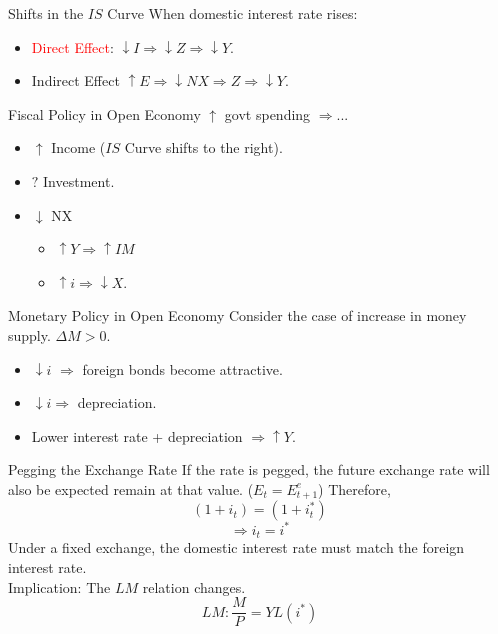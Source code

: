 \documentclass[shownotes,11pt, aspectratio=169]{beamer}
\begin{document}
\begin{frame}{Shifts in the $IS$ Curve}
When domestic interest rate rises:
\begin{itemize}
\item \textcolor{red}{Direct Effect}: $\downarrow I \Rightarrow \downarrow Z \Rightarrow \downarrow Y$.
\item \textcolor{ao(english)}{Indirect Effect} $\uparrow E \Rightarrow \downarrow NX \Rightarrow Z \Rightarrow \downarrow Y$.
\end{itemize}
\end{frame}

\begin{frame}{Fiscal Policy in Open Economy}
$\uparrow$ govt spending $\Rightarrow$...
\begin{itemize}
\item $\uparrow$ Income ($IS$ Curve shifts to the right).
\item $?$ Investment.
\item $\downarrow$ NX
       \begin{itemize}
        \item $\uparrow Y \Rightarrow \uparrow IM$
         \item $\uparrow i \Rightarrow \downarrow X$.
         \end{itemize}
\end{itemize}
\end{frame}

\begin{frame}{Monetary Policy in Open Economy}
Consider the case of increase in money supply. $\Delta M  > 0$.
\begin{itemize}
\item $\downarrow i$ $\Rightarrow$ \pause foreign bonds become attractive.
\item $\downarrow i\Rightarrow$ \pause depreciation.
\item Lower interest rate + depreciation $\Rightarrow \uparrow Y$.
\end{itemize}
\end{frame}

\begin{frame}{Pegging the Exchange Rate}
If the rate is pegged, the future exchange rate will also be expected remain at that value. ($E_t = E_{t+1}^e$)
Therefore,
\[ (1 + i_t) = (1 + i_t^{\ast}) \]
\[\Rightarrow i_t = i^{\ast} \]
Under a fixed exchange, the domestic interest rate must match the foreign interest rate.
\pause
\\
Implication: The $LM$ relation changes.
\[ LM: \frac{M}{P} = YL(i^{\ast}) \]
\end{frame}
\end{document}
